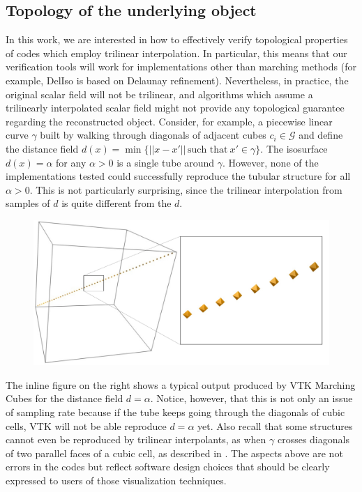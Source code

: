 \subsection{Topology of the underlying object}
In this work, we are interested in how to effectively verify
topological properties of codes which employ trilinear
interpolation. In particular, this means that our verification tools
will work for implementations other than marching methods (for
example, DelIso is based on Delaunay refinement).
%
Nevertheless, in practice, the original scalar field will not be
trilinear, and algorithms which assume a trilinearly interpolated
scalar field might not provide any topological guarantee regarding the
reconstructed object.
Consider, for example, a piecewise linear curve $\gamma$ built by
walking through diagonals of adjacent cubes $c_i \in \mathcal{G}$ and
define the distance field $d(x) = \min\{||x - x'||\, \text{such
  that}\ x'\in\gamma\}$. The isosurface $d(x) = \alpha$ for any
$\alpha > 0$ is a single tube around $\gamma$.  However, none of the
implementations tested could successfully reproduce the tubular
structure for all $\alpha > 0$. This is not particularly surprising,
since the trilinear interpolation from samples of $d$ is quite
different from the $d$.
\begin{figure}
\vspace{-0.2cm}
\hspace{-0.0cm}
\includegraphics[width=0.7\linewidth,keepaspectratio=true]
{chapter3/figures/distance-field.pdf}
\end{figure}
The inline figure on the right shows a typical output produced by VTK
Marching Cubes for the distance field $d = \alpha$. Notice, however,
that this is not only an issue of sampling rate because if the tube
keeps going through the diagonals of cubic cells, VTK will not be able
reproduce $d = \alpha$ yet.  Also recall that some structures cannot
even be reproduced by trilinear interpolants, as when
$\gamma$ crosses diagonals of two parallel faces of a cubic cell, as
described in \cite{Chernyaev95marchingcubes, Pascucci03}.  The aspects
above are not errors in the codes but reflect software design choices
that should be clearly expressed to users of those visualization
techniques.

